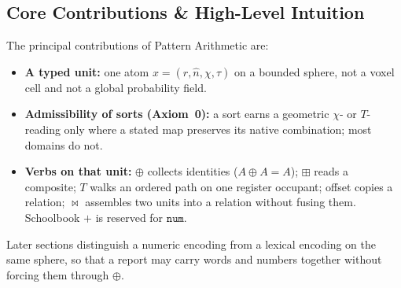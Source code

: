 \documentclass[12pt, a4paper]{article}
\begin{document}
\subsection{Core Contributions \& High-Level Intuition}
The principal contributions of Pattern Arithmetic are:
\begin{itemize}
    \item \textbf{A typed unit:} one atom $x=(r,\hat n,\chi,\tau)$ on a bounded sphere, not a voxel cell and not a global probability field.
    \item \textbf{Admissibility of sorts (Axiom~0):} a sort earns a geometric $\chi$- or $T$-reading only where a stated map preserves its native combination; most domains do not.
    \item \textbf{Verbs on that unit:} $\oplus$ collects identities ($A\oplus A=A$); $\boxplus$ reads a composite; $T$ walks an ordered path on one register occupant; offset copies a relation; $\bowtie$ assembles two units into a relation without fusing them. Schoolbook $+$ is reserved for $\mathtt{num}$.
\end{itemize}

Later sections distinguish a numeric encoding from a lexical encoding on the same sphere, so that a report may carry words and numbers together without forcing them through $\oplus$.
\end{document}
